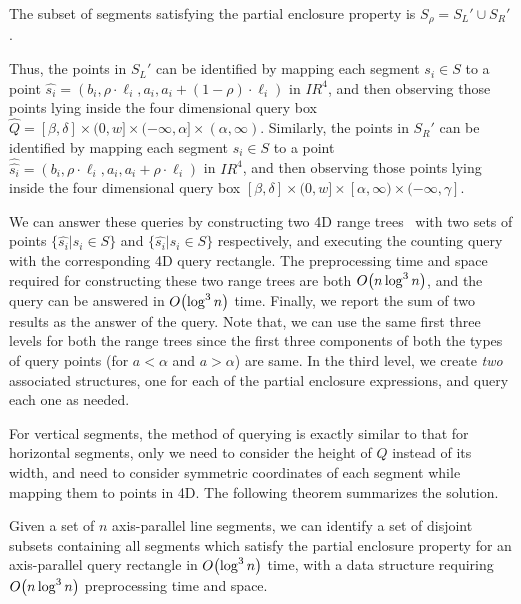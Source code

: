 \begin{observation}
The subset of segments satisfying the partial enclosure property is 
$S_\rho = S_L' \cup S_R'$. 
\end{observation}

Thus, the points in $S_L'$ can be identified by mapping each 
segment $s_i\in S$ to a point $\hat{s_i}=(b_i,\rho\cdot\ell_i,
a_i,a_i + (1-\rho) \cdot\ell_i)$ in $I\!\!R^4$, and then observing  
those points lying inside the  four dimensional query box 
$\hat{Q}=[\beta, \delta] \times (0,w] \times (-\infty,\alpha] \times 
(\alpha,\infty)$. Similarly, the points in $S_R'$ can be identified 
by mapping each segment $s_i\in S$ to a point 
$\hat{\hat{s_i}}=(b_i,\rho\cdot\ell_i,a_i,a_i + \rho 
\cdot\ell_i)$ in $I\!\!R^4$, and then observing  
those points lying inside the  four dimensional query box 
$[\beta, \delta] \times (0, w] \times [\alpha, \infty) 
\times (-\infty, \gamma]$.

We can answer these queries by constructing two 4D range 
trees~\cite{Deberg} with two sets of points $\{\hat{s_i}|s_i 
\in S\}$ and $\{\hat{s_i}|s_i \in S\}$ respectively, and 
executing the counting query with the corresponding 4D query 
rectangle. The preprocessing time and space required for 
constructing these two range trees are both $O\!\left(n \log^3{n}\right)$, 
and the query can be answered in $O\!\left(\log^3{n}\right)$ time. Finally, 
we report the sum of two results as the answer of the query. 
Note that, we can use the same first three levels for both the 
range trees since the first three components of both the types 
of query points (for $a<\alpha$ and $a > \alpha$) are same. In the  
third level, we create \emph{two} associated structures, one for 
each of the partial enclosure expressions, and query each one as 
needed. 

For vertical segments, the method of querying is exactly similar 
to that for horizontal segments, only we need to consider the 
height of $Q$ instead of its width, and need to consider symmetric 
coordinates of each segment while mapping them to points in 4D. 
The following theorem summarizes the solution.

\begin{theorem}
\label{th:ap}
Given a set of $n$ axis-parallel line segments, we can identify a set of disjoint subsets containing all segments which satisfy the partial enclosure property for an axis-parallel query rectangle in $O\!\left(\log^3{n}\right)$ time, with a data structure requiring $O\!\left(n\log^3{n}\right)$ preprocessing time and space.
\end{theorem}

